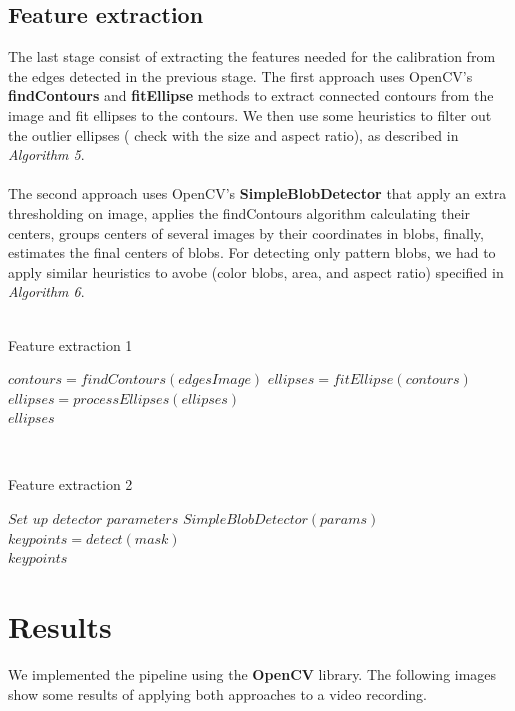 \documentclass[journal]{IEEEtran}
\begin{document}
\subsection{Feature extraction}
The last stage consist of extracting the features needed for the calibration from the edges detected in the previous stage. The first approach uses OpenCV's \textbf{findContours} and \textbf{fitEllipse} methods to extract connected contours from the image and fit ellipses to the contours. We then use some heuristics to filter out the outlier ellipses ( check with the size and aspect ratio), as described in \textit{Algorithm 5}.
\\
\\
The second approach uses OpenCV's \textbf{SimpleBlobDetector} that apply an extra thresholding on image, applies the findContours algorithm calculating their centers, groups centers of several images by their coordinates in blobs, finally, estimates the final centers of blobs. For detecting only pattern blobs, we had to apply similar heuristics to avobe (color blobs, area, and aspect ratio) specified in \textit{Algorithm 6}.
\\
\\
\begin{algorithm}
\caption{Feature extraction 1}
\begin{algorithmic}[1]
\State $contours = \textit{findContours}(edgesImage)$
\State $ellipses = \textit{fitEllipse}(contours)$
\State $ellipses = \textit{processEllipses}(ellipses)$\\
\Return $ellipses$
\end{algorithmic}
\end{algorithm}
\\
\begin{algorithm}
\caption{Feature extraction 2}
\begin{algorithmic}[1]
\State $\textit{Set up detector parameters}$
\State $\textit{SimpleBlobDetector}(params)$
\State $keypoints   = \textit{detect}(mask)$ \\
\Return $keypoints$
\end{algorithmic}
\end{algorithm}

\section{Results}
We implemented the pipeline using the \textbf{OpenCV} library. The following images show some results of applying both approaches to a video recording.
\end{document}
